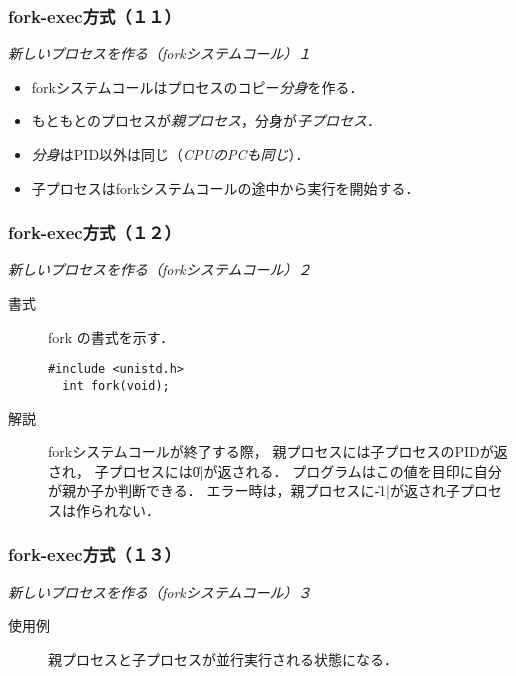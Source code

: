\documentclass{beamer}                 %
\begin{document}
\begin{frame}[fragile]
  \frametitle{fork-exec方式（１１）}
  \emph{新しいプロセスを作る（forkシステムコール）１} \\
  \begin{itemize}
  \item forkシステムコールはプロセスのコピー\emph{分身}を作る．
  \item もともとのプロセスが\emph{親プロセス}，分身が\emph{子プロセス}．
  \item \emph{分身}はPID以外は同じ（\emph{CPUのPCも同じ}）．
  \item 子プロセスはforkシステムコールの途中から実行を開始する．
  \end{itemize}
\end{frame}

\begin{frame}[fragile]
  \frametitle{fork-exec方式（１２）}
  \emph{新しいプロセスを作る（forkシステムコール）２} \\

\begin{description}
\item[書式] fork の書式を示す．
\begin{lstlisting}[numbers=none]
  #include <unistd.h>
  int fork(void);
\end{lstlisting}
\item[解説] 
  forkシステムコールが終了する際，
  親プロセスには子プロセスのPIDが返され，
  子プロセスには\|0|が返される．
  プログラムはこの値を目印に自分が親か子か判断できる．
  エラー時は，親プロセスに\|-1|が返され子プロセスは作られない．
\end{description}
\end{frame}

\begin{frame}[fragile]
  \frametitle{fork-exec方式（１３）}
  \emph{新しいプロセスを作る（forkシステムコール）３} \\

\begin{description}
\item[使用例]
  親プロセスと子プロセスが並行実行される状態になる．
\end{description}
\end{frame}
\end{document}
